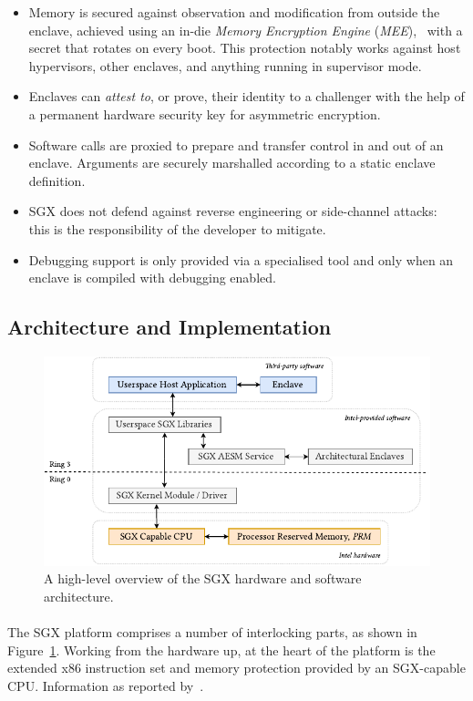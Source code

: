 \begin{itemize}
    \item Memory is secured against observation and modification from outside the enclave, achieved using an in-die \textit{Memory Encryption Engine} (\textit{MEE}),~\cite{sgx-mee} with a secret that rotates on every boot. This protection notably works against host hypervisors, other enclaves, and anything running in supervisor mode.
    \item Enclaves can \textit{attest to}, or prove, their identity to a challenger with the help of a permanent hardware security key for asymmetric encryption.
    \item Software calls are proxied to prepare and transfer control in and out of an enclave. Arguments are securely marshalled according to a static enclave definition.
    \item SGX does not defend against reverse engineering or side-channel attacks:~\cite{10.1109/SP.2015.45} this is the responsibility of the developer to mitigate.
    \item Debugging support is only provided via a specialised tool and only when an enclave is compiled with debugging enabled.
\end{itemize}

\subsection{Architecture and Implementation}

\begin{figure}[]
    \centering
    \includegraphics[width=0.9\linewidth]{figures/SGX-AdvArchitecture.pdf}
    \caption{A high-level overview of the SGX hardware and software architecture.}
    \label{fig:sgx-advarch}
\end{figure}

\paragraph{} The SGX platform comprises a number of interlocking parts, as shown in Figure~\ref{fig:sgx-advarch}. Working from the hardware up, at the heart of the platform is the extended x86 instruction set and memory protection provided by an SGX-capable CPU. Information as reported by~\cite{sgx-sgx-reference,Costan2016IntelSE}.

